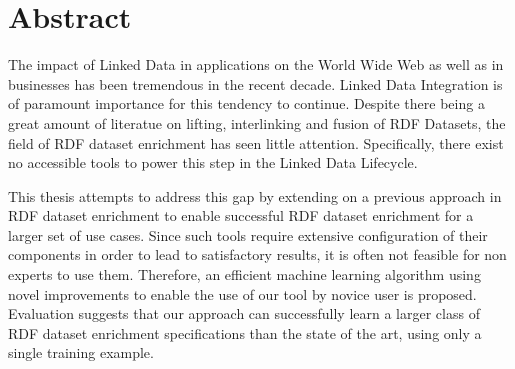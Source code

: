 \begingroup
\let\clearpage\relax
\let\cleardoublepage\relax
\let\cleardoublepage\relax

\chapter*{Abstract}
The impact of Linked Data in applications on the World Wide Web as well as in businesses has been tremendous in the recent decade.
Linked Data Integration is of paramount importance for this tendency to continue.
Despite there being a great amount of literatue on lifting, interlinking and fusion of RDF Datasets, the field of RDF dataset enrichment has seen little attention.
Specifically, there exist no accessible tools to power this step in the Linked Data Lifecycle.

This thesis attempts to address this gap by extending on a previous approach in RDF dataset enrichment to enable successful RDF dataset enrichment for a larger set of use cases.
Since such tools require extensive configuration of their components in order to lead to satisfactory results, it is often not feasible for non experts to use them.
Therefore, an efficient machine learning algorithm using novel improvements to enable the use of our tool by novice user is proposed.
Evaluation suggests that our approach can successfully learn a larger class of RDF dataset enrichment specifications than the state of the art, using only a single training example.

\newpage

